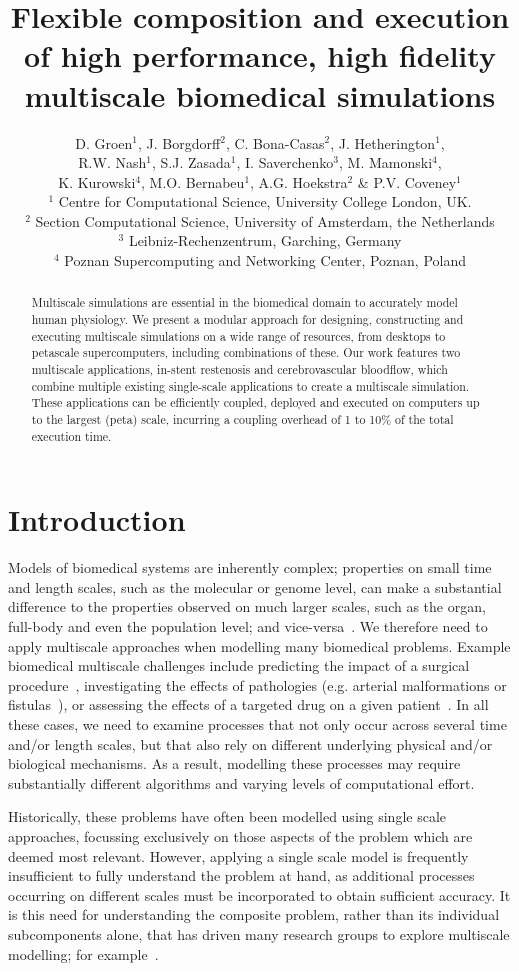\documentclass[a4,10pt]{article}
\title{Flexible composition and execution of high performance, high 
       fidelity multiscale biomedical simulations}
\author{D. Groen$^{1}$, J. Borgdorff$^{2}$, C. Bona-Casas$^{2}$, J. Hetherington$^{1}$,\\ 
R.W. Nash$^{1}$, S.J. Zasada$^{1}$, I. Saverchenko$^{3}$, M. Mamonski$^{4}$,\\
K. Kurowski$^{4}$, M.O. Bernabeu$^{1}$, A.G. Hoekstra$^{2}$ \& P.V. Coveney$^{1}$\\
\small{$^{1}$ Centre for Computational Science, University College London, UK.}\\
\small{$^{2}$ Section Computational Science, University of Amsterdam, the Netherlands}\\
\small{$^{3}$ Leibniz-Rechenzentrum, Garching, Germany}\\
\small{$^{4}$ Poznan Supercomputing and Networking Center, Poznan, Poland}}
\date{}
\begin{document}
\maketitle

\begin{abstract} 
Multiscale simulations are essential in the biomedical domain
to accurately model human physiology. We present a modular
approach for designing, constructing and executing multiscale simulations on a
wide range of resources, from desktops to petascale supercomputers, including
combinations of these.  Our work features two multiscale applications, in-stent
restenosis and cerebrovascular bloodflow, which combine multiple existing
single-scale applications to create a multiscale simulation. These applications
can be efficiently coupled, deployed and executed on computers up to the largest
(peta) scale, incurring a coupling overhead of 1 to 10\% of the total
execution time.  
\end{abstract}

\section{Introduction}

Models of biomedical systems are inherently complex; properties on small time
and length scales, such as the molecular or genome level, can make a
substantial difference to the properties observed on much larger scales, such
as the organ, full-body and even the population level; and vice-versa~\cite{Sloot:2010,Noble:2009}. We
therefore need to apply multiscale approaches when modelling many biomedical
problems. Example biomedical multiscale challenges include predicting the
impact of a surgical procedure~\cite{Tahir:2011}, investigating the effects of pathologies (e.g.
arterial malformations or fistulas~\cite{Migliavacca:2005}), or assessing the effects of a
targeted drug on a given patient~\cite{ObiolPardo:2011}. In all these cases, we need to
examine processes that not only occur across several time and/or length scales, but
that also rely on different underlying physical and/or biological mechanisms. As a
result, modelling these processes may require substantially different algorithms 
and varying levels of computational effort. 

Historically, these problems have often been modelled using single scale
approaches, focussing exclusively on those aspects of the problem which are deemed most
relevant.  However, applying a single scale model is frequently insufficient 
to fully understand the problem at hand, as additional
processes occurring on different scales must be incorporated to obtain
sufficient accuracy. It is this need for understanding the composite
problem, rather than its individual subcomponents alone, that has driven many
research groups to explore multiscale
modelling; for example~\cite{Noble:2002,Finkelstein:2004,Hetherington:2007,Southern:2008}.
\end{document}
